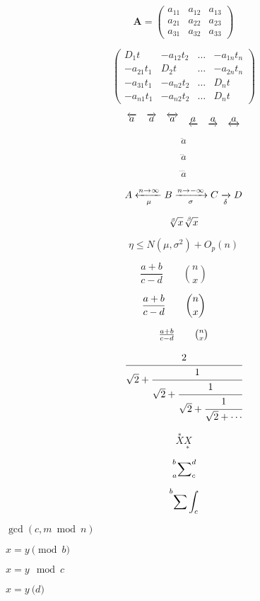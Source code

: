 \documentclass[11pt]{article}
\begin{document}
$$\pmb{A} = \begin{pmatrix}
a_{11} & a_{12} & a_{13} \\
a_{21} & a_{22} & a_{23} \\
a_{31} & a_{32} & a_{33} 
\end{pmatrix}$$

$$\begin{pmatrix}
D_1t & -a_{12}t_2 & \dots & -a_{1n}t_n \\
-a_{21}t_1 & D_2t & \dots & -a_{2n}t_n \\
-a_{31}t_1 & -a_{n2}t_2 & \dots & D_nt \\
-a_{n1}t_1 & -a_{n2}t_2 & \dots & D_nt
\end{pmatrix}$$

$$\overleftarrow{a} \quad \overrightarrow{a} \quad
\overleftrightarrow{a} \quad
\underleftarrow{a} \quad \underrightarrow{a} \quad
\underleftrightarrow{a}$$

$$\ddot a$$

$$\dddot a$$

$$\ddddot a$$

$$A \xleftarrow[\mu]{n\rightarrow\infty} B \xrightarrow[\sigma]{n\rightarrow -\infty} C \xrightarrow[\delta]{\null}D$$

$$\sqrt[\beta]{x} \sqrt[\leftroot{-2}\uproot{2}\beta]{x}$$

$$\boxed{\eta \leq N(\mu, \sigma^2) + O_p(n)}$$

$$\frac{a+b}{c-d} \qquad \binom{n}{x} \qquad$$

$$\dfrac{a+b}{c-d} \qquad \dbinom{n}{x} \qquad$$

$$\tfrac{a+b}{c-d} \qquad \tbinom{n}{x}$$

$$\cfrac{2}{\sqrt{2} + \cfrac{1}{\sqrt{2} + 
\cfrac{1}{\sqrt{2} + \cfrac{1}{\sqrt{2} + \cdots}}}}$$

$$\overset{*}{X} \underset{*}{X}$$

$$\sideset{_a^b}{_c^d}\sum$$

$$\sideset{_{\null}^b}{_c^{\null}}{\sum\int}$$





$\gcd(c,m \bmod n)$

$x=y \pmod b$

$x=y \mod c$

$x=y \pod d$
\end{document}
